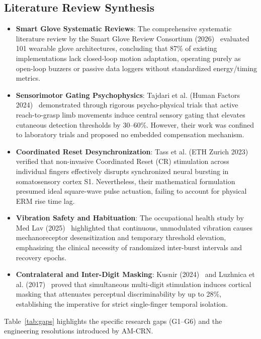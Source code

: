 \documentclass[10pt,twocolumn]{article}
\begin{document}
\subsection{Literature Review Synthesis}
\begin{itemize}
    \item \textbf{Smart Glove Systematic Reviews}: The comprehensive systematic literature review by the Smart Glove Review Consortium (2026)~\cite{springer_2026_smart_glove_slr} evaluated 101 wearable glove architectures, concluding that 87\% of existing implementations lack closed-loop motion adaptation, operating purely as open-loop buzzers or passive data loggers without standardized energy/timing metrics.
    \item \textbf{Sensorimotor Gating Psychophysics}: Tajdari et al. (Human Factors 2024)~\cite{human_factors_2024_motion_sensitivity} demonstrated through rigorous psycho-physical trials that active reach-to-grasp limb movements induce central sensory gating that elevates cutaneous detection thresholds by 30--60\%. However, their work was confined to laboratory trials and proposed no embedded compensation mechanism.
    \item \textbf{Coordinated Reset Desynchronization}: Tass et al. (ETH Zurich 2023)~\cite{jneurophys_2023_somatosensory_finger_rep} verified that non-invasive Coordinated Reset (CR) stimulation across individual fingers effectively disrupts synchronized neural bursting in somatosensory cortex S1. Nevertheless, their mathematical formulation presumed ideal square-wave pulse actuation, failing to account for physical ERM rise time lag.
    \item \textbf{Vibration Safety and Habituation}: The occupational health study by Med Lav (2025)~\cite{med_lav_2025_neurosensory_vibration} highlighted that continuous, unmodulated vibration causes mechanoreceptor desensitization and temporary threshold elevation, emphasizing the clinical necessity of randomized inter-burst intervals and recovery epochs.
    \item \textbf{Contralateral and Inter-Digit Masking}: Kusnir (2024)~\cite{app_2024_contralateral_interference} and Luzhnica et al. (2017)~\cite{acm_2017_sensitivity_prioritisation} proved that simultaneous multi-digit stimulation induces cortical masking that attenuates perceptual discriminability by up to 28\%, establishing the imperative for strict single-finger temporal isolation.
\end{itemize}
Table~\ref{tab:gaps} highlights the specific research gaps (G1--G6) and the engineering resolutions introduced by AM-CRN.
\end{document}
